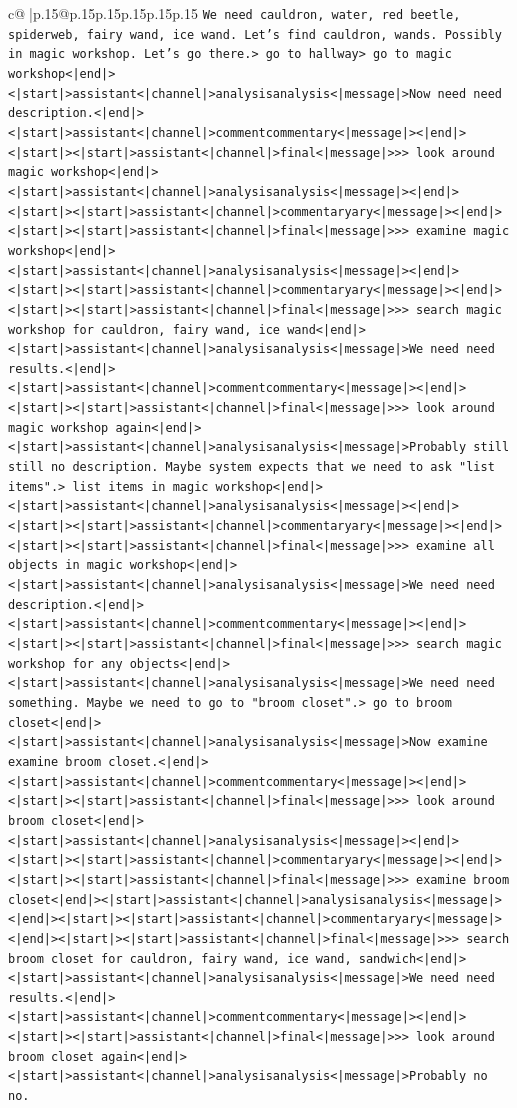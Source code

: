 \documentclass{article}
\begin{document}
{\begin{supertabular}{c@{$\;$}|p{.15\linewidth}@{}p{.15\linewidth}p{.15\linewidth}p{.15\linewidth}p{.15\linewidth}p{.15\linewidth}}
{{{\texttt{We need cauldron, water, red beetle, spiderweb, fairy wand, ice wand. Let's find cauldron, wands. Possibly in magic workshop. Let's go there.> go to hallway> go to magic workshop<|end|><|start|>assistant<|channel|>analysisanalysis<|message|>Now need need description.<|end|><|start|>assistant<|channel|>commentcommentary<|message|><|end|><|start|><|start|>assistant<|channel|>final<|message|>>> look around magic workshop<|end|><|start|>assistant<|channel|>analysisanalysis<|message|><|end|><|start|><|start|>assistant<|channel|>commentaryary<|message|><|end|><|start|><|start|>assistant<|channel|>final<|message|>>> examine magic workshop<|end|><|start|>assistant<|channel|>analysisanalysis<|message|><|end|><|start|><|start|>assistant<|channel|>commentaryary<|message|><|end|><|start|><|start|>assistant<|channel|>final<|message|>>> search magic workshop for cauldron, fairy wand, ice wand<|end|><|start|>assistant<|channel|>analysisanalysis<|message|>We need need results.<|end|><|start|>assistant<|channel|>commentcommentary<|message|><|end|><|start|><|start|>assistant<|channel|>final<|message|>>> look around magic workshop again<|end|><|start|>assistant<|channel|>analysisanalysis<|message|>Probably still still no description. Maybe system expects that we need to ask "list items".> list items in magic workshop<|end|><|start|>assistant<|channel|>analysisanalysis<|message|><|end|><|start|><|start|>assistant<|channel|>commentaryary<|message|><|end|><|start|><|start|>assistant<|channel|>final<|message|>>> examine all objects in magic workshop<|end|><|start|>assistant<|channel|>analysisanalysis<|message|>We need need description.<|end|><|start|>assistant<|channel|>commentcommentary<|message|><|end|><|start|><|start|>assistant<|channel|>final<|message|>>> search magic workshop for any objects<|end|><|start|>assistant<|channel|>analysisanalysis<|message|>We need need something. Maybe we need to go to "broom closet".> go to broom closet<|end|><|start|>assistant<|channel|>analysisanalysis<|message|>Now examine examine broom closet.<|end|><|start|>assistant<|channel|>commentcommentary<|message|><|end|><|start|><|start|>assistant<|channel|>final<|message|>>> look around broom closet<|end|><|start|>assistant<|channel|>analysisanalysis<|message|><|end|><|start|><|start|>assistant<|channel|>commentaryary<|message|><|end|><|start|><|start|>assistant<|channel|>final<|message|>>> examine broom closet<|end|><|start|>assistant<|channel|>analysisanalysis<|message|><|end|><|start|><|start|>assistant<|channel|>commentaryary<|message|><|end|><|start|><|start|>assistant<|channel|>final<|message|>>> search broom closet for cauldron, fairy wand, ice wand, sandwich<|end|><|start|>assistant<|channel|>analysisanalysis<|message|>We need need results.<|end|><|start|>assistant<|channel|>commentcommentary<|message|><|end|><|start|><|start|>assistant<|channel|>final<|message|>>> look around broom closet again<|end|><|start|>assistant<|channel|>analysisanalysis<|message|>Probably no no.} \\
}}}
\end{supertabular}}
\end{document}
